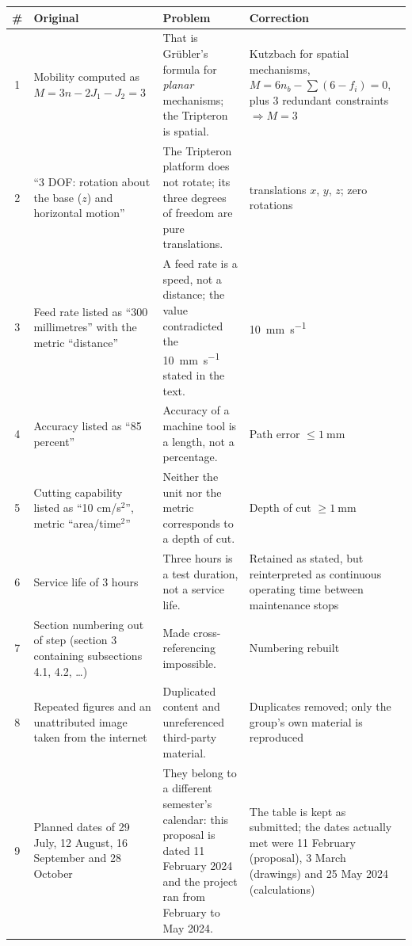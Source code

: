 \documentclass[11pt]{article}
\begin{document}
\begin{center}
\begin{tabular}{@{}c>{\raggedright\arraybackslash}p{4.6cm}>{\raggedright\arraybackslash}p{5.2cm}>{\raggedright\arraybackslash}p{4.2cm}@{}}
\toprule
\textbf{\#} & \textbf{Original} & \textbf{Problem} & \textbf{Correction} \\
\midrule
1 & Mobility computed as $M=3n-2J_1-J_2=3$
  & That is Gr\"ubler's formula for \emph{planar} mechanisms; the Tripteron is spatial.
  & Kutzbach for spatial mechanisms, $M=6n_b-\sum(6-f_i)=0$, plus 3 redundant constraints
    $\Rightarrow M=3$ \\
2 & ``3 DOF: rotation about the base ($z$) and horizontal motion''
  & The Tripteron platform does not rotate; its three degrees of freedom are pure
    translations.
  & 3 translations $x$, $y$, $z$; zero rotations \\
3 & Feed rate listed as ``300 millimetres'' with the metric ``distance''
  & A feed rate is a speed, not a distance; the value contradicted the
    \SI{10}{\milli\metre\per\second} stated in the text.
  & \SI{10}{\milli\metre\per\second} \\
4 & Accuracy listed as ``85 percent''
  & Accuracy of a machine tool is a length, not a percentage.
  & Path error $\le\SI{1}{\milli\metre}$ \\
5 & Cutting capability listed as ``10 cm/s$^2$'', metric ``area/time$^2$''
  & Neither the unit nor the metric corresponds to a depth of cut.
  & Depth of cut $\ge\SI{1}{\milli\metre}$ \\
6 & Service life of 3 hours
  & Three hours is a test duration, not a service life.
  & Retained as stated, but reinterpreted as continuous operating time between maintenance
    stops \\
7 & Section numbering out of step (section 3 containing subsections 4.1, 4.2, \dots)
  & Made cross-referencing impossible.
  & Numbering rebuilt \\
8 & Repeated figures and an unattributed image taken from the internet
  & Duplicated content and unreferenced third-party material.
  & Duplicates removed; only the group's own material is reproduced \\
9 & Planned dates of 29 July, 12 August, 16 September and 28 October
  & They belong to a different semester's calendar: this proposal is dated 11 February
    2024 and the project ran from February to May 2024.
  & The table is kept as submitted; the dates actually met were 11 February (proposal),
    3 March (drawings) and 25 May 2024 (calculations) \\
\bottomrule
\end{tabular}
\end{center}
\end{document}
